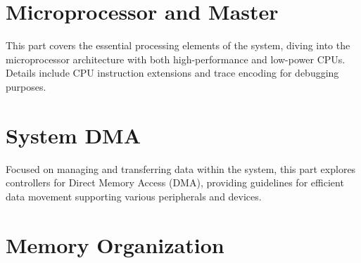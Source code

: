 \documentclass[openany, 10pt]{book}
\begin{document}
\setenglishformatting





\clearpage

\clearpage


\tableofcontents
\clearpage
\listoftables
\clearpage
\listoffigures





\part{Microprocessor and Master}


This part covers the essential processing elements of the system, diving into the microprocessor architecture with both high-performance and low-power CPUs. Details include CPU instruction extensions and trace encoding for debugging purposes.


\part{System DMA}


Focused on managing and transferring data within the system, this part explores controllers for Direct Memory Access (DMA), providing guidelines for efficient data movement supporting various peripherals and devices.


\part{Memory Organization}
\end{document}
